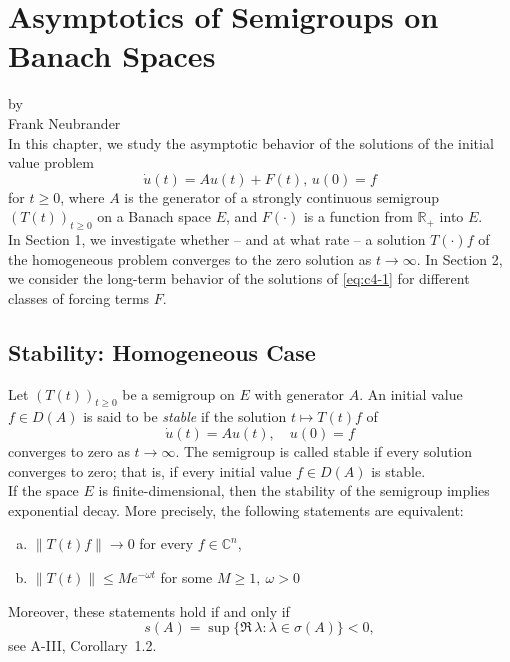 \chapter{Asymptotics of Semigroups on Banach Spaces}\label{chap:a4}
{\Large
\vspace*{-.75cm}
by \\[.25em]
Frank Neubrander
\vspace{.75cm}
\\
}
In this chapter, we study the asymptotic behavior of the solutions of the initial value problem
\begin{equation}\label{eq:c4-1}
\dot{u}(t) = Au(t) + F(t), \, u(0) = f \tag{*}
\end{equation}
for \( t \geq 0 \), where \( A \) is the generator of a strongly continuous semigroup \( (T(t))_{t \geq 0} \) on a Banach space \( E \), and \( F(\cdot) \) is a function from \( \mathbb{R}_{+} \) into \( E \).\\

\noindent
In Section 1, we investigate whether -- and at what rate -- a solution \( T(\cdot)f \) of the homogeneous problem converges to the zero solution as \( t \to \infty \). 
In Section 2, we consider the long-term behavior of the solutions of \eqref{eq:c4-1} for different classes of forcing terms \( F \).
\section{Stability: Homogeneous Case}\label{sec:c4-1}
Let \( (T(t))_{t \geq 0} \) be a semigroup on \( E \) with generator \( A \).
An initial value \( f \in D(A) \) is said to be \emph{stable} if the solution \( t \mapsto T(t)f \) of
\begin{equation}\label{eq:c4-2}
\dot{u}(t) = Au(t), \quad u(0) = f \tag{ACP}
\end{equation}
converges to zero as \( t \to \infty \). 
The semigroup is called stable if every solution converges to zero; that is, if every initial value \( f \in D(A) \) is stable.
\\
\noindent
If the space \( E \) is finite-dimensional, then the stability of the semigroup implies exponential decay. 
More precisely, the following statements are equivalent:
\begin{enumerate}[(a)]
\item \( \|T(t)f\| \to 0 \) for every \( f \in \mathbb{C}^{n} \),
\item \( \|T(t)\| \leq Me^{-\omega t} \) for some \(M \geq 1,\ \omega > 0 \)
\end{enumerate}
Moreover, these statements hold if and only if
\[
s(A) = \sup\{\Re\,\lambda : \lambda \in \sigma(A)\} < 0,
\]
see A-III, Corollary~1.2.
\goodbreak

